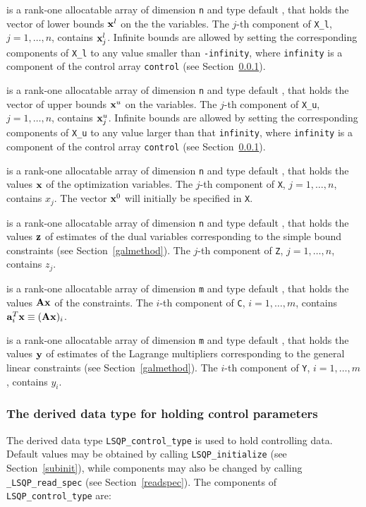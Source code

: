 \documentclass{galahad}
\newcommand{\packagename}{LSQP}
\newcommand{\fullpackagename}{\libraryname\_\-\packagename}
\begin{document}
\begin{description}
 is a rank-one allocatable array of dimension {\tt n} and type 
default \realdp, that holds
the vector of lower bounds ${\mathbf{x}}^{l}$ on the the variables.
The $j$-th component of {\tt X\_l}, $j = 1, \ldots , n$, 
contains ${\mathbf{x}}_{j}^{l}$.
Infinite bounds are allowed by setting the corresponding 
components of {\tt X\_l} to any value smaller than {\tt -infinity}, 
where {\tt infinity} is a component of the control array {\tt control} 
(see Section~\ref{typecontrol}).

 is a rank-one allocatable array of dimension {\tt n} and type 
default \realdp, that holds
the vector of upper bounds ${\mathbf{x}}^{u}$ on the variables.
The $j$-th component of {\tt X\_u}, $j = 1, \ldots , n$, 
contains ${\mathbf{x}}_{j}^{u}$.
Infinite bounds are allowed by setting the corresponding 
components of {\tt X\_u} to any value larger than that {\tt infinity}, 
where {\tt infinity} is a component of the control array {\tt control} 
(see Section~\ref{typecontrol}).

 is a rank-one allocatable array of dimension {\tt n} and type 
default \realdp, 
that holds the values ${\mathbf{x}}$ of the optimization variables.
The $j$-th component of {\tt X}, $j = 1,  \ldots , n$, contains $x_{j}$.  
The vector ${\mathbf{x}}^{0}$ will initially be specified in {\tt X}.

 is a rank-one allocatable array of dimension {\tt n} and type default 
\realdp, that holds
the values ${\mathbf{z}}$ of estimates  of the dual variables 
corresponding to the simple bound constraints (see Section~\ref{galmethod}).
The $j$-th component of {\tt Z}, $j = 1,  \ldots ,  n$, contains $z_{j}$.  

 is a rank-one allocatable array of dimension {\tt m} and type default 
\realdp, that holds
the values ${\mathbf{A}} {\mathbf{x}}$ of the constraints.
The $i$-th component of {\tt C}, $i = 1,  \ldots ,  m$, contains 
${\mathbf{a}}_{i}^{T}{\mathbf{x}} \equiv ({\mathbf{A}} {\mathbf{x}})_{i}$.  

 is a rank-one allocatable array of dimension {\tt m} and type 
default \realdp, that holds
the values ${\mathbf{y}}$ of estimates  of the Lagrange multipliers
corresponding to the general linear constraints (see Section~\ref{galmethod}).
The $i$-th component of {\tt Y}, $i = 1,  \ldots ,  m$, contains $y_{i}$.  

\end{description}


\subsubsection{The derived data type for holding control 
 parameters}\label{typecontrol}
The derived data type 
{\tt \packagename\_control\_type} 
is used to hold controlling data. Default values may be obtained by calling 
{\tt \packagename\_initialize}
(see Section~\ref{subinit}),
while components may also be changed by calling 
{\tt \fullpackagename\_read\-\_spec}
(see Section~\ref{readspec}). 
The components of 
{\tt \packagename\_control\_type} 
are:
\end{document}

